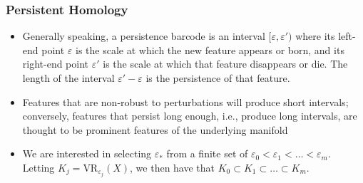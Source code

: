 \documentclass{article}
\newcommand{\VR}{\text{VR}}
\begin{document}
\subsubsection*{Persistent Homology}
\begin{itemize}
	\item Generally speaking, a persistence barcode is an interval $[\varepsilon, \varepsilon')$ where its left-end point $\varepsilon$ is the scale at which the new feature appears or born, and its right-end point $\varepsilon'$ is the scale at which that feature disappears or die. The length of the interval $\varepsilon' - \varepsilon$ is the persistence of that feature.
	\item Features that are non-robust to perturbations will produce short intervals; conversely, features that persist long enough, i.e., produce long intervals, are thought to be prominent features of the underlying manifold
	\item We are interested in selecting $\varepsilon_*$ from a finite set of $\varepsilon_0 < \varepsilon_1 < \dots < \varepsilon_m$. Letting $K_j = \VR_{\varepsilon_j}(X)$, we then have that $K_0 \subset K_1 \subset \dots \subset K_m$. 
\end{itemize}
\end{document}
